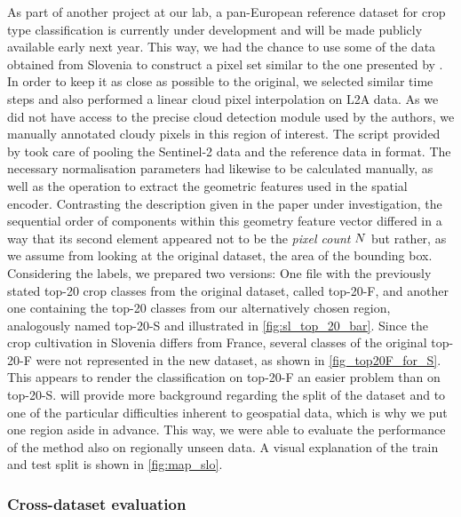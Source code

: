 \figMapSlo
As part of another project at our lab, a pan-European reference dataset for crop type classification is currently under development and will be made publicly available early next year.
This way, we had the chance to use some of the data obtained from Slovenia to construct a {pixel set} similar to the one presented by \textcite{Garnot20:SIT}.
In order to keep it as close as possible to the original, we selected similar time steps and also performed a linear cloud pixel interpolation on L2A \sentinel data.
As we did not have access to the precise cloud detection module used by the authors, we manually annotated cloudy pixels in this region of interest.
The  script provided by \citeauthor{Garnot20:SIT} took care of pooling the Sentinel-2 data and the reference data in \geojson format.
The necessary normalisation parameters had likewise to be calculated manually, as well as the operation to extract the geometric features used in the {spatial encoder}.
Contrasting the description given in the paper under investigation, the sequential order of components within this geometry feature vector differed in a way that its second element appeared not to be the \emph{pixel count} $N$ but rather, as we assume from looking at the original dataset, the area of the bounding box.
Considering the labels, we prepared two versions: 
One file with the previously stated top-20 crop classes from the original dataset, called top-20-F, and another one containing the top-20 classes from our alternatively chosen region, analogously named top-20-S and illustrated in \cref{fig:sl_top_20_bar}.
Since the crop cultivation in Slovenia differs from France, several classes of the original top-20-F were not represented in the new dataset, as shown in \cref{fig_top20F_for_S}.
This appears to render the classification on top-20-F an easier problem than on top-20-S.
 will provide more background regarding the split of the dataset and to one of the particular difficulties inherent to geospatial data, which is why we put one region aside in advance.
This way, we were able to evaluate the performance of the method also on regionally unseen data.
A visual explanation of the train and test split is shown in \cref{fig:map_slo}.


\subsubsection{Cross-dataset evaluation} \label{sec:crossdataset}


